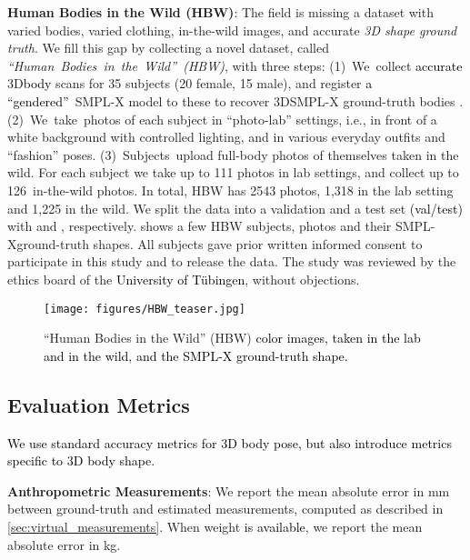 \documentclass[10pt,twocolumn,letterpaper]{article}
\newcommand{\qheading}[1]{\noindent\textbf{#1}:}
\newcommand{\threeD}{3D\xspace}
\newcommand{\hbw}{\mbox{HBW}\xspace}
\newcommand{\colorNUMB}{black}
\newcommand{\hbwNumberSubjects}{{\color{\colorNUMB}35}\xspace}
\newcommand{\hbwNumberSubjectsM}{{\color{\colorNUMB}15}\xspace}
\newcommand{\hbwNumberSubjectsF}{{\color{\colorNUMB}20}\xspace}
\newcommand{\hbwNumberPhotos}{{\color{\colorNUMB}2543}\xspace}
\newcommand{\hbwNumberPhotosLab}{{\color{\colorNUMB}1,318}\xspace}
\newcommand{\hbwNumberPhotosWild}{{\color{\colorNUMB}1,225}\xspace}
\newcommand{\hbwNumberPhotosLabTHRESHperSubj}{{\color{\colorNUMB}111}\xspace}
\newcommand{\hbwNumberPhotosWildTHRESHperSubj}{{\color{\colorNUMB}126}\xspace}
\newcommand{\hbwNumberSPLITSsubj}{{\color{\colorNUMB}{10/25 subjects (6/14 female 4/11 male)}}\xspace}
\newcommand{\hbwNumberSPLITSimg}{{\color{\colorNUMB}{781/1,762 images (432/983 female 349/779 male)}}\xspace}
\newcommand{\smplx}{\mbox{SMPL-X}\xspace}
\newcommand{\smplX}{\smplx}
\newcommand{\groundtruth}{\mbox{ground-truth}\xspace}
\newcommand{\inthewild}{\mbox{in-the-wild}\xspace}
\renewcommand{\ie}{\mbox{i.e.}\xspace}
\newcommand{\cameraready}[1]{\textcolor{Fuchsia}{{#1}}\xspace}
\renewcommand{\cameraready}[1]{\textcolor{black}{{#1}}\xspace}
\newcommand{\colorTERM}{blue}
\renewcommand{\colorTERM}{black}
\newcommand{\Measurements}[0]{{\color{\colorTERM}Anthropometric Measurements}\xspace}
\begin{document}
\qheading{Human Bodies in the Wild (\hbw)}
The field is missing a dataset with
varied bodies, varied clothing, \inthewild images, and accurate \emph{\threeD shape ground truth}. 
We fill this gap by collecting a novel dataset, 
called
\mbox{\emph{``Human Bodies in the Wild'' (\hbw)}}, 
with three steps: \mbox{(1)     We collect} \cameraready{accurate} \threeD \cameraready{body} scans for \hbwNumberSubjects subjects (\hbwNumberSubjectsF female, \hbwNumberSubjectsM male), and register \cameraready{a ``gendered''}~\smplX model to these to recover \threeD \smplX ground-truth bodies \cameraready{\cite{Dyna}}. 
\mbox{(2)     We take photos} of each subject in ``photo-lab'' settings, \ie, in front of a white background with controlled lighting, and in various everyday outfits and ``fashion'' poses. 
\mbox{(3)     Subjects upload} full-body photos of themselves taken in the wild. For each subject we take up to \hbwNumberPhotosLabTHRESHperSubj photos in lab settings, and collect up to \hbwNumberPhotosWildTHRESHperSubj~\inthewild photos. 
In total, \hbw has \hbwNumberPhotos photos, \hbwNumberPhotosLab in the lab setting and  \hbwNumberPhotosWild in the wild. 
We split the data into a validation and a test set \cameraready{(val/test)} with 
\hbwNumberSPLITSsubj
and 
\hbwNumberSPLITSimg, 
respectively.
 shows a few \hbw subjects, photos and their \smplX \groundtruth shapes.
All subjects gave prior written informed consent to participate in this study and to release the data. The study was reviewed by the 
ethics board 
of the \cameraready{University of T{\"ubingen}}, without objections.

\begin{figure}\centering
    \texttt{[image: figures/HBW\_teaser.jpg]}
	\caption{``Human Bodies in the Wild'' (\hbw)
    \cameraready{color images, taken in the lab and in the wild,
    and the \smplx ground-truth shape.}
	}
	\label{fig:hbw}
\end{figure}
 
 \subsection{Evaluation Metrics} \label{sec:metrics}

\cameraready{We use standard accuracy metrics for \threeD body pose, but also introduce metrics specific to  \threeD body shape.} 

\qheading{\Measurements}
We report the mean absolute error in mm between \groundtruth and estimated measurements, computed 
as described in \cref{sec:virtual_measurements}. 
When weight \cameraready{is available}, we report the mean absolute error in kg. 
\end{document}
